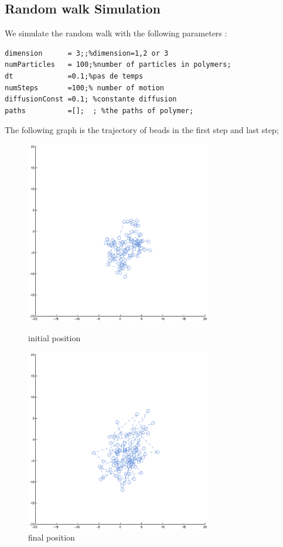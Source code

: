 \documentclass{article}
\begin{document}
\subsection{Random walk Simulation}
We simulate the random walk with the following parameters :
\begin{lstlisting}
dimension      = 3;;%dimension=1,2 or 3
numParticles   = 100;%number of particles in polymers;
dt             =0.1;%pas de temps
numSteps       =100;% number of motion
diffusionConst =0.1; %constante diffusion
paths          =[];  ; %the paths of polymer;
\end{lstlisting}
The following graph is the trajectory of beads in the first step and last step;
\begin{figure}[H]
	\begin{minipage}[t]{0.5\textwidth}
		\centering
	
		
		\includegraphics[width=3.2in]{1.eps}
		\caption{initial position}
	\end{minipage}%
	\begin{minipage}[t]{0.5\textwidth}
		\centering
		\includegraphics[width=3.2in]{2.eps}
		\caption{final position}
		
	\end{minipage}
\end{figure}
\end{document}
